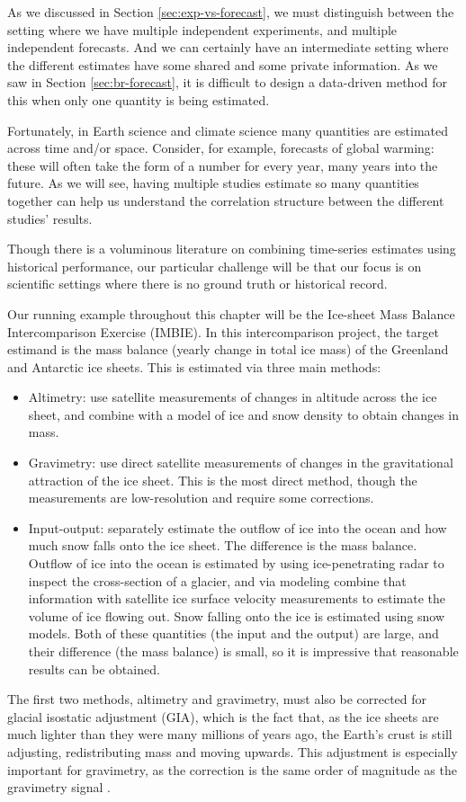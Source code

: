 \documentclass[letterpaper,12pt]{article}
\begin{document}
As we discussed in Section \ref{sec:exp-vs-forecast}, we must distinguish between the setting where we have multiple independent experiments, and multiple independent forecasts. And we can certainly have an intermediate setting where the different estimates have some shared and some private information. As we saw in Section \ref{sec:br-forecast}, it is difficult to design a data-driven method for this when only one quantity is being estimated.

Fortunately, in Earth science and climate science many quantities are estimated across time and/or space. Consider, for example, forecasts of global warming: these will often take the form of a number for every year, many years into the future. As we will see, having multiple studies estimate so many quantities together can help us understand the correlation structure between the different studies' results.

Though there is a voluminous literature on combining time-series estimates using historical performance, our particular challenge will be that our focus is on scientific settings where there is no ground truth or historical record.

Our running example throughout this chapter will be the Ice-sheet Mass Balance Intercomparison Exercise (IMBIE). In this intercomparison project, the target estimand is the mass balance (yearly change in total ice mass) of the Greenland and Antarctic ice sheets. This is estimated via three main methods:
\begin{itemize}
  \item Altimetry: use satellite measurements of changes in altitude across the ice sheet, and combine with a model of ice and snow density to obtain changes in mass.
  \item Gravimetry: use direct satellite measurements of changes in the gravitational attraction of the ice sheet. This is the most direct method, though the measurements are low-resolution and require some corrections.
  \item Input-output: separately estimate the outflow of ice into the ocean and how much snow falls onto the ice sheet. The difference is the mass balance. Outflow of ice into the ocean is estimated by using ice-penetrating radar to inspect the cross-section of a glacier, and via modeling combine that information with satellite ice surface velocity measurements to estimate the volume of ice flowing out. Snow falling onto the ice is estimated using snow models. Both of these quantities (the input and the output) are large, and their difference (the mass balance) is small, so it is impressive that reasonable results can be obtained.
\end{itemize}
The first two methods, altimetry and gravimetry, must also be corrected for glacial isostatic adjustment (GIA), which is the fact that, as the ice sheets are much lighter than they were many millions of years ago, the Earth's crust is still adjusting, redistributing mass and moving upwards. This adjustment is especially important for gravimetry, as the correction is the same order of magnitude as the gravimetry signal \citep[pg.~6]{caron2020baseline}.
\end{document}
